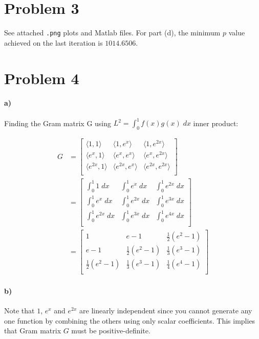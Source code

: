 \documentclass[10pt,letter]{article}
\newcommand{\inr}[2]{\langle #1, #2\rangle}
\begin{document}
\pagebreak

\section*{Problem 3}

See attached \texttt{.png} plots and Matlab files. For part (d), the minimum $p$ value achieved on the last iteration is $1014.6506$.

\section*{Problem 4}

\paragraph{a)} Finding the Gram matrix G using $L^2 = \int^1_0 f(x)g(x)\; dx$ inner product:

\begin{align*}
G &=
\left[ {\begin{array}{ccccc}
 \inr{1}{1} & \inr{1}{e^x} & \inr{1}{e^{2x}}  \\
 \inr{e^x}{1} & \inr{e^x}{e^x} & \inr{e^x}{e^{2x}}  \\
 \inr{e^{2x}}{1} & \inr{e^{2x}}{e^x} & \inr{e^{2x}}{e^{2x}}  \\
\end{array} } \right]
\\ &=
\left[ {\begin{array}{ccccc}
 \int^1_0 1\; dx & \int^1_0 e^x\; dx & \int^1_0 e^{2x}\; dx  \\
 \int^1_0 e^x\; dx & \int^1_0 e^{2x}\; dx & \int^1_0 e^{3x}\; dx  \\
 \int^1_0 e^{2x}\; dx & \int^1_0 e^{3x}\; dx & \int^1_0 e^{4x}\; dx  \\
\end{array} } \right]
\\ &=
\left[ {\begin{array}{ccccc}
 1 & e - 1 & \frac{1}{2}(e^2 - 1)  \\
 e - 1 & \frac{1}{2}(e^2 - 1) & \frac{1}{3}(e^3 - 1)  \\
 \frac{1}{2}(e^2 - 1) & \frac{1}{3}(e^3 - 1) & \frac{1}{4}(e^4 - 1)  \\
\end{array} } \right]
\end{align*}

\paragraph{b)} Note that $1$, $e^x$ and $e^{2x}$ are linearly independent since you cannot generate any one function by combining the others using only scalar coefficients. This implies that Gram matrix $G$ must be positive-definite.
\end{document}

